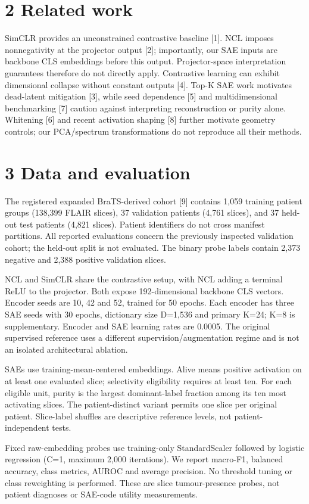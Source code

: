 \documentclass[10pt]{article}
\begin{document}
\clearpage
\section*{2  Related work}
SimCLR provides an unconstrained contrastive baseline [1]. NCL imposes nonnegativity at the projector output [2]; importantly, our SAE inputs are backbone CLS embeddings before this output. Projector-space interpretation guarantees therefore do not directly apply. Contrastive learning can exhibit dimensional collapse without constant outputs [4]. Top-K SAE work motivates dead-latent mitigation [3], while seed dependence [5] and multidimensional benchmarking [7] caution against interpreting reconstruction or purity alone. Whitening [6] and recent activation shaping [8] further motivate geometry controls; our PCA/spectrum transformations do not reproduce all their methods.

\section*{3  Data and evaluation}
The registered expanded BraTS-derived cohort [9] contains 1,059 training patient groups (138,399 FLAIR slices), 37 validation patients (4,761 slices), and 37 held-out test patients (4,821 slices). Patient identifiers do not cross manifest partitions. All reported evaluations concern the previously inspected validation cohort; the held-out split is not evaluated. The binary probe labels contain 2,373 negative and 2,388 positive validation slices.

NCL and SimCLR share the contrastive setup, with NCL adding a terminal ReLU to the projector. Both expose 192-dimensional backbone CLS vectors. Encoder seeds are 10, 42 and 52, trained for 50 epochs. Each encoder has three SAE seeds with 30 epochs, dictionary size D=1,536 and primary K=24; K=8 is supplementary. Encoder and SAE learning rates are 0.0005. The original supervised reference uses a different supervision/augmentation regime and is not an isolated architectural ablation.

SAEs use training-mean-centered embeddings. Alive means positive activation on at least one evaluated slice; selectivity eligibility requires at least ten. For each eligible unit, purity is the largest dominant-label fraction among its ten most activating slices. The patient-distinct variant permits one slice per original patient. Slice-label shuffles are descriptive reference levels, not patient-independent tests.

Fixed raw-embedding probes use training-only StandardScaler followed by logistic regression (C=1, maximum 2,000 iterations). We report macro-F1, balanced accuracy, class metrics, AUROC and average precision. No threshold tuning or class reweighting is performed. These are slice tumour-presence probes, not patient diagnoses or SAE-code utility measurements.
\end{document}
